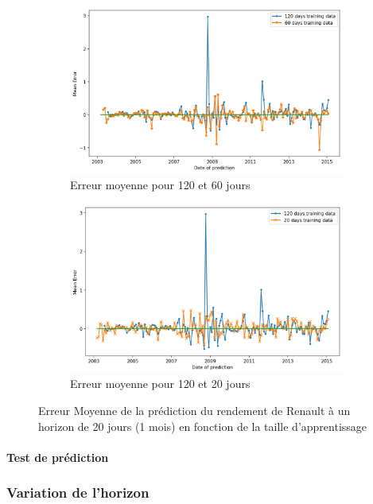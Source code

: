 \begin{figure}[H]
\centering
\begin{subfigure}{.5\textwidth}
\centering
\includegraphics[width=.9\linewidth, scale=0.2]
{plot/ME_Trainingset1.png}
\caption{Erreur moyenne pour 120 et 60 jours}
\label{fig:ME_Ts1}
\end{subfigure}%
\begin{subfigure}{.5\textwidth}
\centering
\includegraphics[width=.9\linewidth, scale=0.2]
{plot/ME_Trainingset2.png}
\caption{Erreur moyenne pour 120 et 20 jours}
\label{fig:ME_Ts2}
\end{subfigure}
\caption{Erreur Moyenne de la prédiction du rendement de Renault à un horizon de 20 jours (1 mois) en fonction de la taille d'apprentissage}
\label{fig:ME_Trainingset}
\end{figure}

\paragraph{Test de prédiction}



\subsubsection{Variation de l'horizon}

